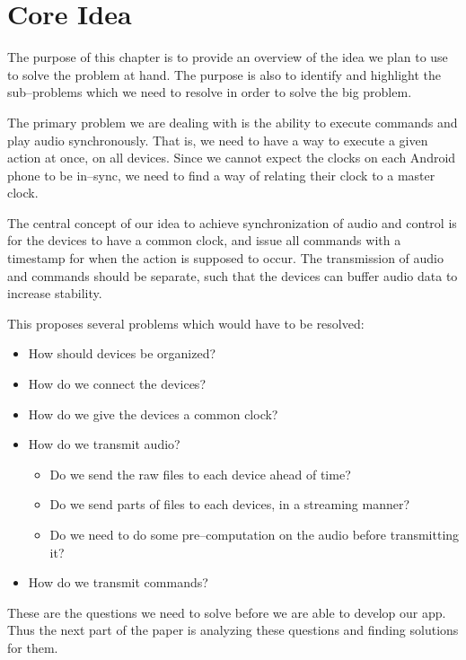 \chapter{Core Idea} %

The purpose of this chapter is to provide an overview of the idea we plan to use to solve the problem at hand. 
The purpose is also to identify and highlight the sub--problems which we need to resolve in order to solve the big problem.

The primary problem we are dealing with is the ability to execute commands and play audio synchronously.
That is, we need to have a way to execute a given action at once, on all devices.
Since we cannot expect the clocks on each Android phone to be in--sync, we need to find a way of relating their clock to a master clock. 

The central concept of our idea to achieve synchronization of audio and control is for the devices to have a common clock, and issue all commands with a timestamp for when the action is supposed to occur. 
The transmission of audio and commands should be separate, such that the devices can buffer audio data to increase stability. 

This proposes several problems which would have to be resolved:
\begin{itemize}
    \item How should devices be organized?
    \item How do we connect the devices?
    \item How do we give the devices a common clock?
    \item How do we transmit audio?
    \begin{itemize}
        \item Do we send the raw files to each device ahead of time?
        \item Do we send parts of files to each devices, in a streaming manner?
        \item Do we need to do some pre--computation on the audio before transmitting it?
    \end{itemize}
    \item How do we transmit commands?
\end{itemize}

These are the questions we need to solve before we are able to develop our app. 
Thus the next part of the paper is analyzing these questions and finding solutions for them. 

